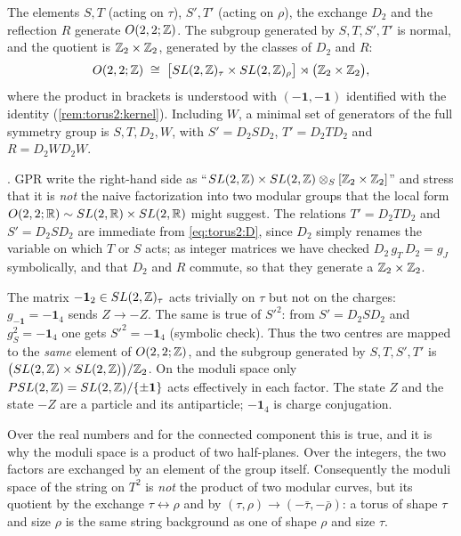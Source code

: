 \begin{theorem}\label{thm:torus2:group}
The elements $S,T$ (acting on $\tau$), $S',T'$ (acting on $\rho$), the exchange $D_2$ and the
reflection $R$ generate $O(2,2;\mathbb{Z})$. The subgroup generated by $S,T,S',T'$ is normal, and the
quotient is $\mathbb{Z}_2\times\mathbb{Z}_2$, generated by the classes of $D_2$ and $R$:
\begin{equation}\label{eq:torus2:structure}
 O(2,2;\mathbb{Z})\;\cong\;\big[SL(2,\mathbb{Z})_\tau\times SL(2,\mathbb{Z})_\rho\big]\rtimes\big(\mathbb{Z}_2\times\mathbb{Z}_2\big),
\end{equation}
where the product in brackets is understood with $(-\mathbf 1,-\mathbf 1)$ identified with
the identity (\cref{rem:torus2:kernel}). Including $W$, a minimal set of generators of the full
symmetry group is $S,T,D_2,W$, with
$S'=D_2SD_2$, $T'=D_2TD_2$ and $R=D_2WD_2W$.
\end{theorem}

\noindent{}. GPR write the right-hand side as
``$SL(2,\mathbb{Z})\times SL(2,\mathbb{Z})\otimes_S[\mathbb{Z}_2\times\mathbb{Z}_2]$'' and stress that it is \emph{not} the
naive factorization into two modular groups that the local form
$O(2,2;\mathbb{R})\sim SL(2,\mathbb{R})\times SL(2,\mathbb{R})$ might suggest. The relations $T'=D_2TD_2$ and
$S'=D_2SD_2$ are immediate from \eqref{eq:torus2:D}, since $D_2$ simply renames the variable
on which $T$ or $S$ acts; as integer matrices we have checked $D_2\,g_T\,D_2=g_J$ symbolically,
and that $D_2$ and $R$ commute, so that they generate a $\mathbb{Z}_2\times\mathbb{Z}_2$.

\begin{remark}\label{rem:torus2:kernel}
The matrix $-\mathbf 1_2\in SL(2,\mathbb{Z})_\tau$ acts trivially on $\tau$ but not on the charges:
$g_{-\mathbf 1}=-\mathbf 1_4$ sends $Z\to-Z$. The same is true of $S'^2$: from $S'=D_2SD_2$
and $g_S^2=-\mathbf 1_4$ one gets $S'^2=-\mathbf 1_4$ (symbolic check). Thus the two centres
are mapped to the \emph{same} element of $O(2,2;\mathbb{Z})$, and the subgroup generated by
$S,T,S',T'$ is $\big(SL(2,\mathbb{Z})\times SL(2,\mathbb{Z})\big)/\mathbb{Z}_2$. On the moduli space only
$PSL(2,\mathbb{Z})=SL(2,\mathbb{Z})/\{\pm\mathbf 1\}$ acts effectively in each factor. The state
$Z$ and the state $-Z$ are a particle and its antiparticle; $-\mathbf 1_4$ is charge
conjugation.
\end{remark}

\begin{pitfallbox} 
Over the real numbers and for the connected component this is true, and it is why the
moduli space is a product of two half-planes. Over the integers, the two factors are
exchanged by an element of the group itself. Consequently the moduli space of the string on
$T^2$ is \emph{not} the product of two modular curves, but its quotient by the exchange
$\tau\leftrightarrow\rho$ and by $(\tau,\rho)\to(-\bar\tau,-\bar\rho)$: a torus of shape
$\tau$ and size $\rho$ is the same string background as one of shape $\rho$ and size $\tau$.
\end{pitfallbox}


